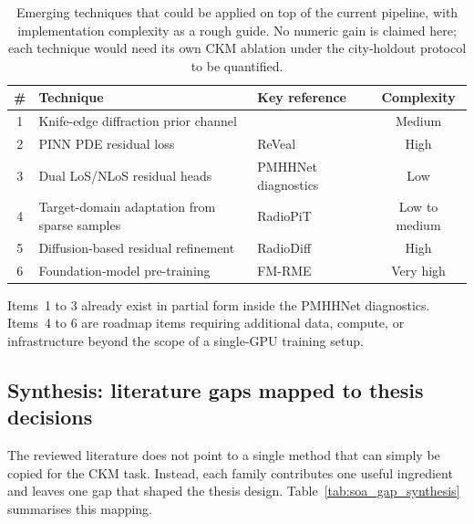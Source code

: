 \begin{table}[ht]
\centering
\caption[Emerging techniques for future CKM work.]%
{Emerging techniques that could be applied on top of the current
pipeline, with implementation complexity as a rough guide. No numeric gain is
claimed here; each technique would need its own CKM ablation under the
city-holdout protocol to be quantified.}
\label{tab:emerging}
\begin{tabularx}{\textwidth}{clXc}
\toprule
\textbf{\#} & \textbf{Technique} & \textbf{Key reference} & \textbf{Complexity} \\
\midrule
1 & Knife-edge diffraction prior channel & \cite{geomDL2024} & Medium \\
2 & PINN PDE residual loss & ReVeal \cite{reveal2025} & High \\
3 & Dual LoS/NLoS residual heads & PMHHNet diagnostics & Low \\
4 & Target-domain adaptation from sparse samples & RadioPiT \cite{radiopit2025} & Low to medium \\
5 & Diffusion-based residual refinement & RadioDiff \cite{radiodiff2025} & High \\
6 & Foundation-model pre-training & FM-RME \cite{fmrme2026} & Very high \\
\bottomrule
\end{tabularx}
\end{table}

Items~1 to 3 already exist in partial form inside the PMHHNet diagnostics. Items~4 to 6
are roadmap items requiring additional data, compute, or infrastructure beyond
the scope of a single-GPU training setup.

\subsection{Synthesis: literature gaps mapped to thesis decisions}

The reviewed literature does not point to a single method that can simply be
copied for the CKM task. Instead, each family contributes one useful ingredient
and leaves one gap that shaped the thesis design. Table~\ref{tab:soa_gap_synthesis}
summarises this mapping.

